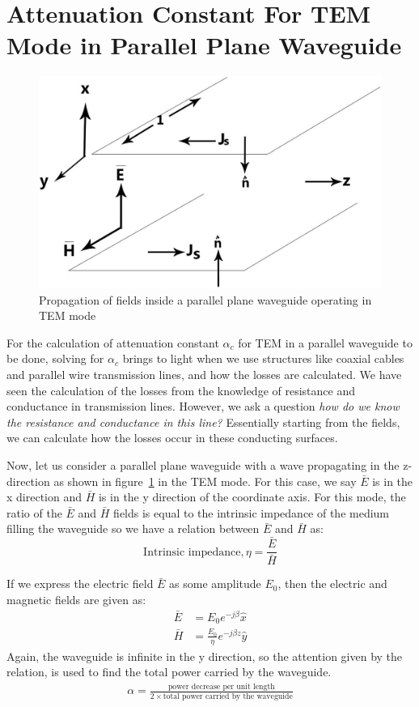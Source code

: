 \section{Attenuation Constant For TEM Mode in Parallel Plane Waveguide}
\begin{figure}[h]
\centering
\includegraphics[width=0.8\linewidth]{./graphics/411}
\caption{Propagation of fields inside a parallel plane waveguide operating in TEM mode}
\label{fig:elcture2imageb}
\end{figure}

For the calculation of attenuation constant $\alpha_c$  for TEM in a parallel waveguide to be done, solving for $\alpha_c$ brings to light when we use structures like coaxial cables and parallel wire transmission lines, and how the losses are calculated. We have seen the calculation of the losses from the knowledge of resistance and conductance in transmission lines. However, we ask a question \emph{how do we know the resistance and conductance in this line?} Essentially starting from the fields, we can calculate how the losses occur in these conducting surfaces.

Now, let us consider a parallel plane waveguide with a wave propagating in the z-direction as shown in figure~\ref{fig:elcture2imageb} in the TEM mode. For this case, we say $\bar{E}$ is in the x direction and $\bar{H}$ is in the y direction of the coordinate axis. For this mode, the ratio of the $\bar{E}$ and $\bar{H}$ fields is equal to the intrinsic impedance of the medium filling the waveguide so we have a relation between $\bar{E}$ and $\bar{H}$ as:
\begin{dmath*}
\text{Intrinsic impedance}, \eta = \frac{\bar{E}}{\bar{H}}
\end{dmath*}

If we express the electric field $\bar{E}$ as some amplitude $E_0$, then the electric and magnetic fields are given as:
\begin{align*}
\bar{E} &= E_0 e^{-j\beta }\hat{x}\\
\bar{H} &= \frac{E_0}{\eta} e^{-j\beta z}\hat{y}
\end{align*}
Again, the waveguide is infinite in the y direction, so the attention given by the relation, is used to find the total power carried by the waveguide.
\begin{align}
\alpha = \frac{\text{power decrease per unit length}}{2 \times \text{total power carried by the waveguide}}
\label{eqn:alphac}
\end{align}

